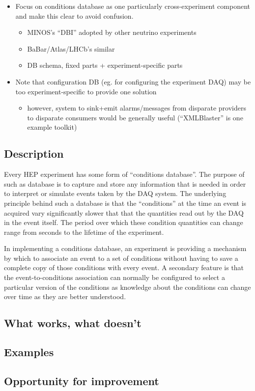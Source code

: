 \begin{itemize}
\item Focus on conditions database as one particularly cross-experiment component and make this clear to avoid confusion.
  \begin{itemize}
  \item MINOS's ``DBI'' adopted by other neutrino experiments
  \item BaBar/Atlas/LHCb's similar
  \item DB schema, fixed parts + experiment-specific parts
  \end{itemize}
\item Note that configuration DB (eg. for configuring the experiment DAQ) may be too experiment-specific to provide one solution
  \begin{itemize}
  \item however, system to sink+emit alarms/messages from disparate providers to disparate consumers would be generally useful (``XMLBlaster'' is one example toolkit)
  \end{itemize}
\end{itemize}

\subsection{Description}

Every HEP experiment has some form of ``conditions database''. The purpose of such as database is to capture and store any information that is needed in order to interpret or simulate events taken by the DAQ system. The underlying principle behind such a database is that the ``conditions'' at the time an event is acquired vary significantly slower that that the quantities read out by the DAQ in the event itself. The period over which these condition quantities can change range from seconds to the lifetime of the experiment.

In implementing a conditions database, an experiment is providing a mechanism by which to associate an event to a set of conditions without having to save a complete copy of those conditions with every event. A secondary feature is that the event-to-conditions association can normally be configured to select a particular version of the conditions as knowledge about the conditions can change over time as they are better understood.

\subsection{What works, what doesn't}
\subsection{Examples}
\subsection{Opportunity for improvement}

